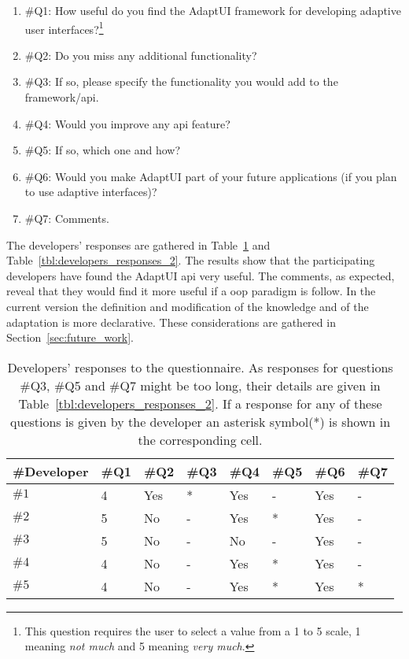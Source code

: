 \begin{enumerate}
 \item \#Q1: How useful do you find the AdaptUI framework for developing adaptive 
 user interfaces?\footnote{This question requires the user to select a value from
 a 1 to 5 scale, 1 meaning \textit{not much} and 5 meaning \textit{very much}.}
 \item \#Q2: Do you miss any additional functionality?
 \item \#Q3: If so, please specify the functionality you would add to the 
 framework/\ac{api}.
 \item \#Q4: Would you improve any \ac{api} feature?
 \item \#Q5: If so, which one and how?
 \item \#Q6: Would you make AdaptUI part of your future applications (if you 
 plan to use adaptive interfaces)?
 \item \#Q7: Comments.
\end{enumerate}

The developers' responses are gathered in Table~\ref{tbl:developers_responses}
and Table~\ref{tbl:developers_responses_2}. The results show that the participating 
developers have found the AdaptUI \ac{api} very useful. The comments, as expected, 
reveal that they would find it more useful if a \acs{oop} paradigm is follow. 
In the current version the definition and modification of the knowledge and of 
the adaptation is more declarative. These considerations are gathered in 
Section~\ref{sec:future_work}.

\begin{table}
  \caption{Developers' responses to the questionnaire. As responses for questions 
  \#Q3, \#Q5 and \#Q7 might be too long, their details are given in 
  Table~\ref{tbl:developers_responses_2}. If a response for any of these questions
  is given by the developer an asterisk symbol(*) is shown in the corresponding
  cell.}
 \label{tbl:developers_responses}
\footnotesize
\centering
 \begin{tabular}{l l l l l l l l}
  \hline 
  \textbf{\#Developer} 	& \textbf{\#Q1} & \textbf{\#Q2} & \textbf{\#Q3} & \textbf{\#Q4} & \textbf{\#Q5} & \textbf{\#Q6} & \textbf{\#Q7} \\
  \hline
  $\#1$			& 4		& Yes		& * 		& Yes	 	& - 		& Yes 		& - \\
  $\#2$			& 5		& No		& - 		& Yes		& *		& Yes		& - \\
  $\#3$			& 5		& No		& - 		& No		& -		& Yes		& - \\
  $\#4$			& 4		& No		& - 		& Yes		& *		& Yes		& - \\
  $\#5$			& 4		& No		& - 		& Yes		& *		& Yes		& * \\
  \hline
\end{tabular}
\end{table}

